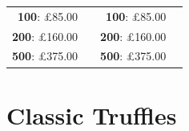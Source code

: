 \documentclass[11pt, english]{article}
\begin{document}
\begin{table}[h]
\begin{center}
\begin{tabular}{r|p{4cm}r|p{4cm}}
		\textbf{100}: \pounds85.00 & & \textbf{100}: \pounds85.00 & \\
		\textbf{200}: \pounds160.00 & & \textbf{200}: \pounds160.00 & \\
		\textbf{500}: \pounds375.00 & & \textbf{500}: \pounds375.00 & \\
	\end{tabular}
	\end{center}
	\end{table}

	\vspace{1cm}

\section{Classic Truffles}
\end{document}
